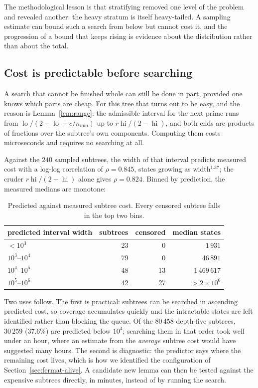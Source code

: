 \documentclass[11pt]{amsart}
\theoremstyle{remark}
\DeclareMathOperator{\lo}{lo}
\DeclareMathOperator{\hi}{hi}
\begin{document}
The methodological lesson is that stratifying removed one level of the problem
and revealed another: the heavy stratum is itself heavy-tailed. A sampling
estimate can bound such a search from below but cannot cost it, and the
progression of a bound that keeps rising is evidence about the distribution
rather than about the total.

\subsection{Cost is predictable before searching}\label{sec:predictor}
A search that cannot be finished whole can still be done in part, provided one
knows which parts are cheap. For this tree that turns out to be easy, and the
reason is Lemma~\ref{lem:range}: the admissible interval for the next prime runs
from $\lo/(2 - \lo + c/n_{\min})$ up to $r\hi/(2-\hi)$, and both ends are
products of fractions over the subtree's own components. Computing them costs
microseconds and requires no searching at all.

Against the $240$ sampled subtrees, the width of that interval predicts measured
cost with a log-log correlation of $\rho = 0.845$, states growing as
width$^{1.37}$; the cruder $r\hi/(2-\hi)$ alone gives $\rho = 0.824$. Binned by
prediction, the measured medians are monotone:

\begin{table}[h]
\centering
\begin{tabular}{lrrr}
\toprule
predicted interval width & subtrees & censored & median states \\
\midrule
$< 10^{3}$          & 23 & 0  & $1\,931$ \\
$10^{3}$--$10^{4}$  & 79 & 0  & $46\,891$ \\
$10^{4}$--$10^{5}$  & 48 & 13 & $1\,469\,617$ \\
$10^{5}$--$10^{6}$  & 42 & 27 & $> 2 \times 10^{6}$ \\
\bottomrule
\end{tabular}
\caption{Predicted against measured subtree cost. Every censored subtree falls in
the top two bins.}
\end{table}

Two uses follow. The first is practical: subtrees can be searched in ascending
predicted cost, so coverage accumulates quickly and the intractable states are
left identified rather than blocking the queue. Of the $80\,458$ depth-five
subtrees, $30\,259$ ($37.6\%$) are predicted below $10^{4}$; searching them in
that order took well under an hour, where an estimate from the \emph{average}
subtree cost would have suggested many hours. The second is diagnostic: the
predictor says where the remaining cost lives, which is how we identified the
configuration of Section~\ref{sec:fermat-alive}. A candidate new lemma can then be
tested against the expensive subtrees directly, in minutes, instead of by running
the search.
\end{document}
